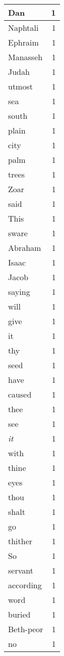 \begin{center}
\begin{longtable}{l|r}
Dan & 1 \\ \hline
Naphtali & 1 \\ \hline
Ephraim & 1 \\ \hline
Manasseh & 1 \\ \hline
Judah & 1 \\ \hline
utmost & 1 \\ \hline
sea & 1 \\ \hline
south & 1 \\ \hline
plain & 1 \\ \hline
city & 1 \\ \hline
palm & 1 \\ \hline
trees & 1 \\ \hline
Zoar & 1 \\ \hline
said & 1 \\ \hline
This & 1 \\ \hline
sware & 1 \\ \hline
Abraham & 1 \\ \hline
Isaac & 1 \\ \hline
Jacob & 1 \\ \hline
saying & 1 \\ \hline
will & 1 \\ \hline
give & 1 \\ \hline
it & 1 \\ \hline
thy & 1 \\ \hline
seed & 1 \\ \hline
have & 1 \\ \hline
caused & 1 \\ \hline
thee & 1 \\ \hline
see & 1 \\ \hline
\emph{it} & 1 \\ \hline
with & 1 \\ \hline
thine & 1 \\ \hline
eyes & 1 \\ \hline
thou & 1 \\ \hline
shalt & 1 \\ \hline
go & 1 \\ \hline
thither & 1 \\ \hline
So & 1 \\ \hline
servant & 1 \\ \hline
according & 1 \\ \hline
word & 1 \\ \hline
buried & 1 \\ \hline
Beth-peor & 1 \\ \hline
no & 1 \\ \hline

\end{longtable}
\end{center}
